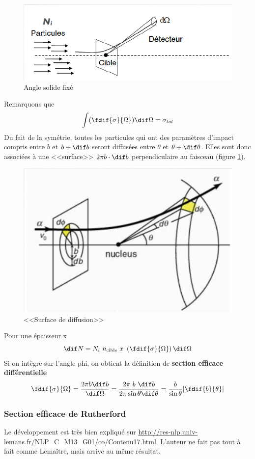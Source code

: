 \begin{figure}[ht]
    \centering
    \includegraphics[scale=0.75]{Images1/anglesolide.PNG}
    \caption{Angle solide fixé}
\end{figure}
Remarquons que
\[
    \int(\fdif{\sigma}{\Omega})\dif \Omega=\sigma_{tot}
\]
Du fait de la symétrie, toutes les particules qui ont des paramètres d'impact compris entre $b$ et $b+\dif b$ seront diffusées entre $\theta$ et $\theta+\dif\theta$. Elles sont donc associées à une <<surface>> $2\pi b\cdot \dif b$ perpendiculaire au faisceau (figure \ref{fig:surface_de_diffusion}).
\begin{figure}[ht]
    \centering
    \includegraphics[scale=0.75]{Images1/surface_perp.PNG}
    \caption{<<Surface de diffusion>>}
    \label{fig:surface_de_diffusion}
\end{figure}
Pour une épaisseur x
\[
    \dif N=N_i~n_{\text{cible}}~x~\left(\fdif{\sigma}{\Omega}\right)\dif \Omega
\]
Si on intègre sur l'angle phi, on obtient la définition de \textbf{section efficace différentielle}
\[
    \fdif{\sigma}{\Omega}=\dfrac{2\pi b \dif b}{\dif \Omega}=\dfrac{2\pi~b~\dif b}{2\pi \sin{\theta}\dif\theta}=\dfrac{b}{\sin{\theta}}\abs{\fdif{b}{\theta}}
\]

\subsubsection{Section efficace de Rutherford}
Le développement est très bien expliqué sur \url{http://res-nlp.univ-lemans.fr/NLP_C_M13_G01/co/Contenu17.html}. L'auteur ne fait pas tout à fait comme Lemaître, mais arrive au même résultat.


